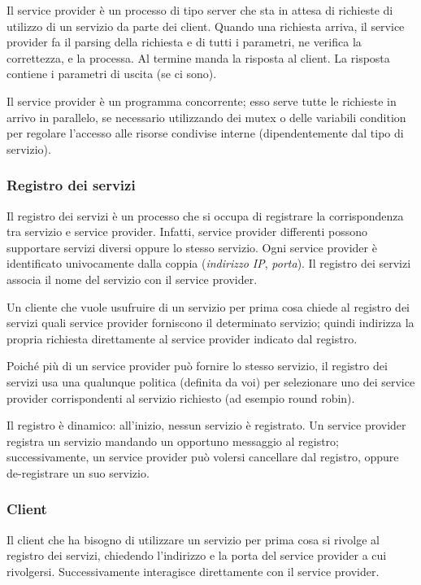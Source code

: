 \documentclass[a4paper,twoside]{article}
\begin{document}
Il service provider è un processo di tipo server che sta in attesa di richieste di utilizzo di un servizio da parte dei client. Quando una richiesta arriva, il service provider fa il parsing della richiesta e di tutti i parametri, ne verifica la correttezza, e la processa. Al termine manda la risposta al client. La risposta contiene i parametri di uscita (se ci sono).

Il service provider è un programma concorrente; esso serve tutte le richieste in arrivo in parallelo, se necessario utilizzando dei mutex o delle variabili condition per regolare l'accesso alle risorse condivise interne (dipendentemente dal tipo di servizio).

\subsubsection{Registro dei servizi}
Il registro dei servizi è un processo che si occupa di registrare la corrispondenza tra servizio e service provider. Infatti, service provider differenti possono supportare servizi diversi oppure lo stesso servizio. Ogni service provider è identificato univocamente dalla coppia (\emph{indirizzo IP}, \emph{porta}). Il registro dei servizi associa il nome del servizio con il service provider.

Un cliente che vuole usufruire di un servizio per prima cosa chiede al registro dei servizi quali service provider forniscono il determinato servizio; quindi indirizza la propria richiesta direttamente al service provider indicato dal registro.

Poiché più di un service provider può fornire lo stesso servizio, il registro dei servizi usa una qualunque politica (definita da voi) per selezionare uno dei service provider corrispondenti al servizio richiesto (ad esempio round robin).

Il registro è dinamico: all’inizio, nessun servizio è registrato. Un service provider registra un servizio mandando un opportuno messaggio al registro; successivamente, un service provider può volersi cancellare dal registro, oppure de-registrare un suo servizio.

\subsubsection{Client}
Il client che ha bisogno di utilizzare un servizio per prima cosa si rivolge al registro dei servizi, chiedendo l’indirizzo e la porta del service provider a cui rivolgersi. Successivamente interagisce direttamente con il service provider.
\end{document}
